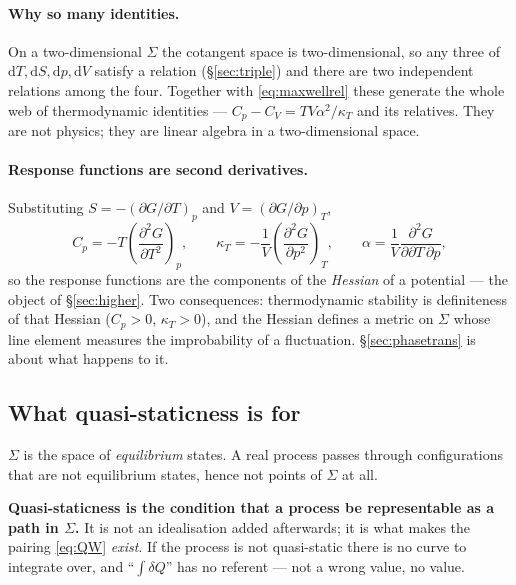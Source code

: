 \documentclass[10pt,a4paper]{article}
\newcommand{\dd}{\mathrm{d}}
\newcommand{\pd}[2]{\frac{\partial #1}{\partial #2}}
\theoremstyle{plain}
\theoremstyle{definition}
\numberwithin{equation}{section}
\begin{document}
\paragraph{Why so many identities.} On a two-dimensional $\Sigma$ the cotangent space is
two-dimensional, so any three of $\dd T,\dd S,\dd p,\dd V$ satisfy a relation
(\S\ref{sec:triple}) and there are two independent relations among the four. Together with
\eqref{eq:maxwellrel} these generate the whole web of thermodynamic identities ---
$C_p-C_V=TV\alpha^2/\kappa_T$ and its relatives. They are not physics; they are linear algebra
in a two-dimensional space.

\paragraph{Response functions are second derivatives.} Substituting
$S=-(\partial G/\partial T)_p$ and $V=(\partial G/\partial p)_T$,
\begin{equation}
C_p=-T\left(\pd{^2G}{T^2}\right)_{\!p},\qquad
\kappa_T=-\frac1V\left(\pd{^2G}{p^2}\right)_{\!T},\qquad
\alpha=\frac1V\pd{^2G}{\partial T\,\partial p},
\end{equation}
so the response functions are the components of the \emph{Hessian} of a potential --- the object
of \S\ref{sec:higher}. Two consequences: thermodynamic stability is definiteness of that Hessian
($C_p>0$, $\kappa_T>0$), and the Hessian defines a metric on $\Sigma$ whose line element
measures the improbability of a fluctuation. \S\ref{sec:phasetrans} is about what happens to it.

\subsection{What quasi-staticness is for}
\label{sec:quasistatic}

$\Sigma$ is the space of \emph{equilibrium} states. A real process passes through
configurations that are not equilibrium states, hence not points of $\Sigma$ at all.

\begin{keybox}
\textbf{Quasi-staticness is the condition that a process be representable as a path in
$\Sigma$.} It is not an idealisation added afterwards; it is what makes the pairing
\eqref{eq:QW} \emph{exist}. If the process is not quasi-static there is no curve to integrate
over, and ``$\int\delta Q$'' has no referent --- not a wrong value, no value.
\end{keybox}
\end{document}
